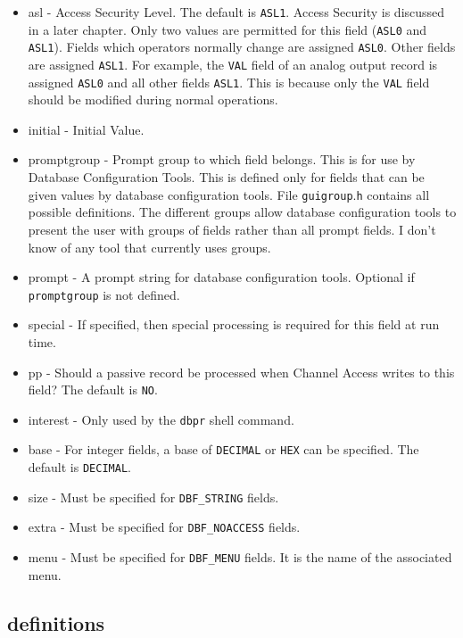 \begin{itemize}\item {}asl - Access Security Level. The default is \verb|ASL1|. Access Security is discussed in a later chapter. Only two values 
are permitted for this field (\verb|ASL0| and \verb|ASL1|). Fields which operators normally change are assigned \verb|ASL0|. Other 
fields are assigned \verb|ASL1|. For example, the \verb|VAL| field of an analog output record is assigned \verb|ASL0| and all other 
fields \verb|ASL1|. This is because only the \verb|VAL| field should be modified during normal operations.

\item {}initial - Initial Value.

\item \index{[promptgroup - field definition rules}promptgroup - Prompt group to which field belongs. This is for use by Database Configuration Tools. This is 
defined only for fields that can be given values by database configuration tools. File \verb|guigroup|.\verb|h| contains all 
possible definitions. The different groups allow database configuration tools to present the user with groups of 
fields rather than all prompt fields. I don't know of any tool that currently uses groups.

\item {}prompt - A prompt string for database configuration tools. Optional if \verb|promptgroup| is not defined.

\item {}special - If specified, then special processing is required for this field at run time.

\item {}pp - Should a passive record be processed when Channel Access writes to this field? The default is \verb|NO|.

\item {}interest - Only used by the \verb|dbpr| shell command.

\item {}base - For integer fields, a base of \verb|DECIMAL| or \verb|HEX| can be specified. The default is \verb|DECIMAL|.

\item {}size - Must be specified for \verb|DBF_STRING| fields.

\item {}extra - Must be specified for \verb|DBF_NOACCESS| fields.

\item {}menu - Must be specified for \verb|DBF_MENU| fields. It is the name of the associated menu.

\end{itemize}\subsection{definitions}

